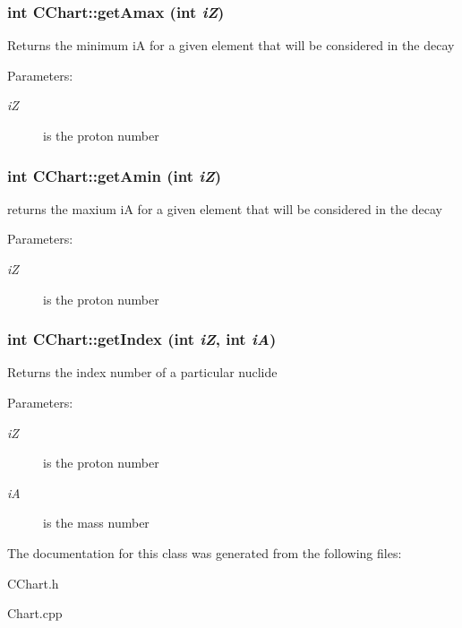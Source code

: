 \subsubsection{\setlength{\rightskip}{0pt plus 5cm}int CChart::get\-Amax (int {\em i\-Z})}\label{classCChart_e8dc2778d3aa4aced64e4f9770ecce0f}


Returns the minimum i\-A for a given element that will be considered in the decay \begin{Desc}
\item[Parameters:]
\begin{description}
\item[{\em i\-Z}]is the proton number \end{description}
\end{Desc}
\subsubsection{\setlength{\rightskip}{0pt plus 5cm}int CChart::get\-Amin (int {\em i\-Z})}\label{classCChart_e055972f3bdbd9445d9c8880cb3f8038}


returns the maxium i\-A for a given element that will be considered in the decay \begin{Desc}
\item[Parameters:]
\begin{description}
\item[{\em i\-Z}]is the proton number \end{description}
\end{Desc}
\subsubsection{\setlength{\rightskip}{0pt plus 5cm}int CChart::get\-Index (int {\em i\-Z}, int {\em i\-A})}\label{classCChart_3eec994101c137549298aa062d8a45ce}


Returns the index number of a particular nuclide \begin{Desc}
\item[Parameters:]
\begin{description}
\item[{\em i\-Z}]is the proton number \item[{\em i\-A}]is the mass number \end{description}
\end{Desc}


The documentation for this class was generated from the following files:\begin{CompactItemize}
\item 
CChart.h\item 
Chart.cpp\end{CompactItemize}
